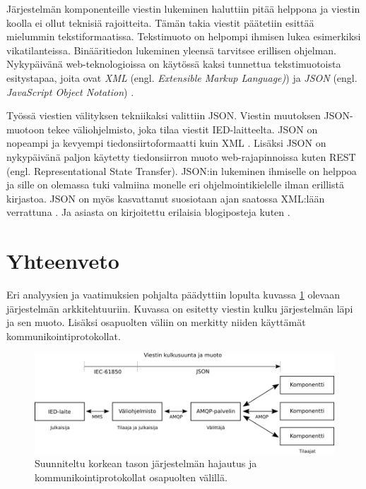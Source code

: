 Järjestelmän komponenteille viestin lukeminen haluttiin pitää helppona ja viestin koolla ei ollut teknisiä rajoitteita. Tämän takia viestit päätetiin esittää mielummin tekstiformaatissa. Tekstimuoto on helpompi ihmisen lukea esimerkiksi vikatilanteissa. Binääritiedon lukeminen yleensä tarvitsee erillisen ohjelman. Nykypäivänä web-teknologioissa on käytössä kaksi tunnettua tekstimuotoista esitystapaa, joita ovat \emph{XML} (engl. \emph{Extensible Markup Language)}) \cite{xml-specification} ja \emph{JSON} (engl. \emph{JavaScript Object Notation}) \cite{json-standard}.

Työssä viestien välityksen tekniikaksi valittiin JSON. Viestin muutoksen JSON-muotoon tekee väliohjelmisto, joka tilaa viestit IED-laitteelta. JSON on nopeampi ja kevyempi tiedonsiirtoformaatti kuin XML \cite{json-xml-comparison}. Lisäksi JSON on nykypäivänä paljon käytetty tiedonsiirron muoto web-rajapinnoissa kuten REST (engl. Representational State Transfer). JSON:in lukeminen ihmiselle on helppoa ja sille on olemassa tuki valmiina monelle eri ohjelmointikielelle ilman erillistä kirjastoa. JSON on myös kasvattanut suosiotaan ajan saatossa XML:lään verrattuna \cite{google-trends-xml-json}. Ja asiasta on kirjoitettu erilaisia blogiposteja kuten \cite{the-rise-and-rise-of-json, why-json-is-better-than-xml, Patrizio2016}.


\section{Yhteenveto}
Eri analyysien ja vaatimuksien pohjalta päädyttiin lopulta kuvassa \ref{fig:high-level-system-architecture} olevaan järjestelmän arkkitehtuuriin. Kuvassa on esitetty viestin kulku järjestelmän läpi ja sen muoto. Lisäksi osapuolten väliin on merkitty niiden käyttämät kommunikointiprotokollat.

\begin{figure}[ht!]
	\includegraphics[width=1\textwidth]{pictures/high-level-system-architecture.png}
	\caption{Suunniteltu korkean tason järjestelmän hajautus ja kommunikointiprotokollat osapuolten välillä.}
	\label{fig:high-level-system-architecture}
\end{figure}

